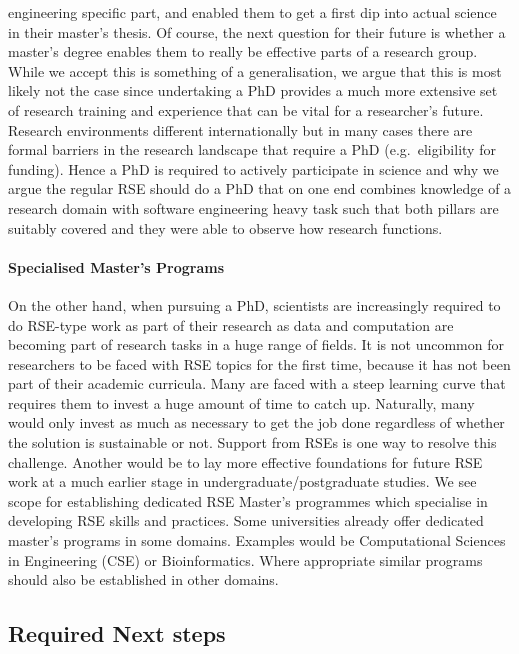 \documentclass[a4paper
]{article}
\begin{document}
engineering specific part, and enabled them to get a first dip into
actual science in their master's thesis. Of course, the next question
for their future is whether a master's degree enables them to really be
effective parts of a research group. While we accept this is something
of a generalisation, we argue that this is most likely not the case
since undertaking a PhD provides a much more extensive set of research
training and experience that can be vital for a researcher's future.
Research environments different internationally but in many cases there
are formal barriers in the research landscape that require a PhD
(e.g.~eligibility for funding). Hence a PhD is required to actively
participate in science and why we argue the regular RSE should do a PhD
that on one end combines knowledge of a research domain with software
engineering heavy task such that both pillars are suitably covered and
they were able to observe how research functions.

\hypertarget{specialised-masters-programs}{%
\paragraph{Specialised Master's
Programs}\label{specialised-masters-programs}}

On the other hand, when pursuing a PhD, scientists are increasingly
required to do RSE-type work as part of their research as data and
computation are becoming part of research tasks in a huge range of
fields. It is not uncommon for researchers to be faced with RSE topics
for the first time, because it has not been part of their academic
curricula. Many are faced with a steep learning curve that requires them
to invest a huge amount of time to catch up. Naturally, many would only
invest as much as necessary to get the job done regardless of whether
the solution is sustainable or not. Support from RSEs is one way to
resolve this challenge. Another would be to lay more effective
foundations for future RSE work at a much earlier stage in
undergraduate/postgraduate studies. We see scope for establishing
dedicated RSE Master's programmes which specialise in developing RSE
skills and practices. Some universities already offer dedicated master's
programs in some domains. Examples would be Computational Sciences in
Engineering (CSE) or Bioinformatics. Where appropriate similar programs
should also be established in other domains.

\hypertarget{required-next-steps}{%
\subsection{Required Next steps}\label{required-next-steps}}
\end{document}
